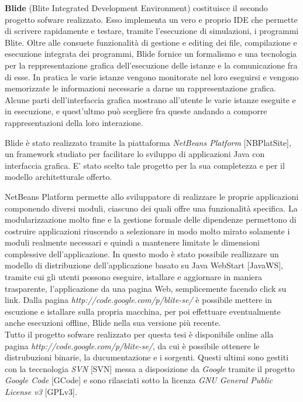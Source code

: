 \textbf{Blide} (Blite Integrated Development Environment) costituisce il
secondo progetto sofware realizzato. Esso implementa un
vero e proprio IDE che permette di scrivere rapidamente e testare, tramite
l'esecuzione di simulazioni, i programmi Blite. Oltre alle consuete
funzionalità di gestione e editing dei file, compilazione e esecuzione
integrata dei programmi, Blide fornice un formalismo e una tecnologia per la
reppresentazione grafica dell'esecuzione delle istanze e la comunicazione fra
di esse. In pratica le varie istanze vengono monitorate nel loro eseguirsi e
vengono memorizzate le informazioni necessarie a darne un rappresentazione
grafica. Alcune parti dell'interfaccia grafica mostrano all'utente le varie
istanze eseguite e in esecuzione, e quest'ultmo può scegliere fra queste
andando a comporre rappresentazioni della loro interazione.

Blide è stato realizzato tramite la piattaforma \emph{NetBeans Platform}
[NBPlatSite], un framework studiato per facilitare lo sviluppo di applicazioni
Java con interfaccia grafica. E' stato scelto tale progetto per la sua
completezza e per il modello architetturale offerto. 

NetBeans Platform permette allo sviluppatore di realizzare le proprie
applicazioni componendo diversi moduli, ciascuno dei quali offre una
funzionalità specifica. La modularizzazione molto fine e la gestione
formale delle dipendenze permettono di costruire applicazioni riuscendo a
selezionare in modo molto mirato solamente i moduli realmente necessari e
quindi a mantenere limitate le dimensioni complessive dell'applicazione. 
In questo modo è stato possibile reallizzare un modello di distribuzione
dell'applicazione basato su Java WebStart [JavaWS], tramite cui gli utenti
possono eseguire, istallare e aggiornare in maniera trasparente, l'applicazione
da una pagina Web, semplicemente facendo click su link. Dalla pagina 
\emph{http://code.google.com/p/blite-se/} è possibile mettere in escuzione e
istallare sulla propria macchina, per poi effettuare eventualmente anche
esecuzioni offline, Blide nella sua versione più recente.
\\

Tutto il progetto sofware realizzato per questa tesi è disponibile online alla
pagina \emph{http://code.google.com/p/blite-se/}, da cui è possibile ottenere le
distrubuzioni binarie, la ducumentazione e i sorgenti. Questi ultimi sono
gestiti con la teccnologia \emph{SVN} [SVN] messa a disposizione da
\emph{Google} tramite il progetto \emph{Google Code} [GCode] e sono rilasciati
sotto la licenza \emph{GNU General Public License v3} [GPLv3].
\\

